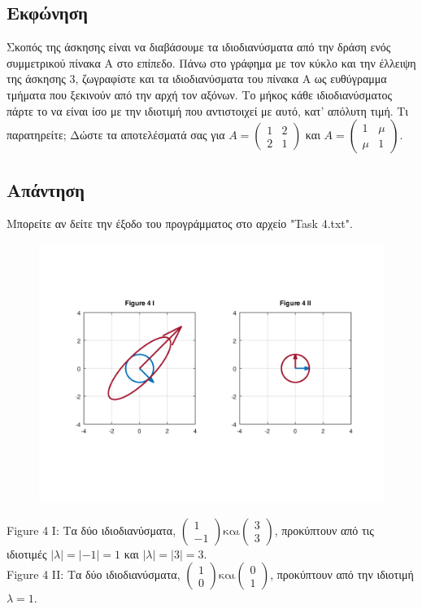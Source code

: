 \documentclass[a4paper,12pt]{article}
\begin{document}
\subsection{Εκφώνηση}
Σκοπός της άσκησης είναι να διαβάσουμε τα ιδιοδιανύσματα από την δράση ενός
συμμετρικού πίνακα Α στο επίπεδο. Πάνω στο γράφημα με τον κύκλο και την
έλλειψη της άσκησης 3, ζωγραφίστε και τα ιδιοδιανύσματα του πίνακα Α ως
ευθύγραμμα τμήματα που ξεκινούν από την αρχή τον αξόνων. Το μήκος κάθε
ιδιοδιανύσματος πάρτε το να είναι ίσο με την ιδιοτιμή που αντιστοιχεί με
αυτό, κατ' απόλυτη τιμή. Τι παρατηρείτε; Δώστε
τα αποτελέσματά σας για $
	A=\begin{pmatrix}
		1 & 2 \\
		2 & 1
	\end{pmatrix}
$ και $
	A=\begin{pmatrix}
		1   & \mu \\
		\mu & 1
	\end{pmatrix}
$.
\subsection{Απάντηση}
Μπορείτε αν δείτε την έξοδο του προγράμματος στο αρχείο "Task 4.txt".
\begin{center}
	\begin{figure}[H]
		\centering
		\includegraphics[scale=0.8]{4i_ii.png}
	\end{figure}
	Figure 4 I: Τα δύο ιδιοδιανύσματα, $
		\begin{pmatrix}
			1 \\
			-1
		\end{pmatrix} \text{και}
		\begin{pmatrix}
			3 \\
			3
		\end{pmatrix}
	$, προκύπτουν από τις ιδιοτιμές $|λ|=|-1|=1$ και $|λ|=|3|=3$.\\
	Figure 4 II: Τα δύο ιδιοδιανύσματα, $
		\begin{pmatrix}
			1 \\
			0
		\end{pmatrix} \text{και}
		\begin{pmatrix}
			0 \\
			1
		\end{pmatrix}
	$, προκύπτουν από την ιδιοτιμή $λ=1$.
\end{center}
\end{document}
